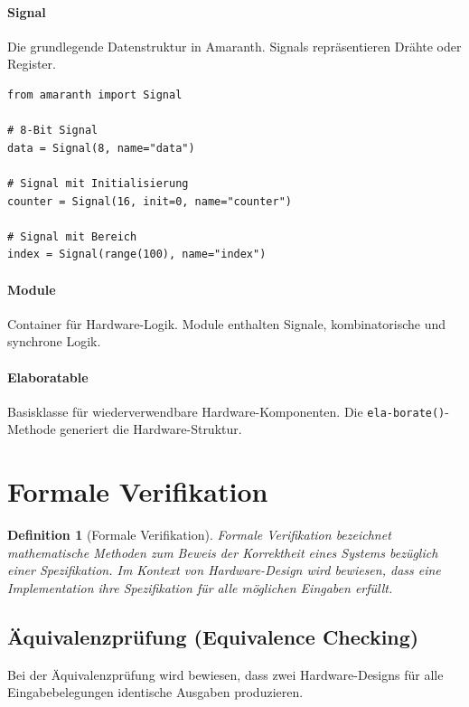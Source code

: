 ﻿\documentclass[12pt,a4paper]{report}
\newtheorem{definition}{Definition}[section]
\begin{document}
\paragraph{Signal}
Die grundlegende Datenstruktur in Amaranth. Signals repräsentieren Drähte oder Register.

\begin{lstlisting}[style=pythonstyle, caption={Amaranth Signal-Deklaration}]
from amaranth import Signal

# 8-Bit Signal
data = Signal(8, name="data")

# Signal mit Initialisierung
counter = Signal(16, init=0, name="counter")

# Signal mit Bereich
index = Signal(range(100), name="index")
\end{lstlisting}

\paragraph{Module}
Container für Hardware-Logik. Module enthalten Signale, kombinatorische und synchrone Logik.

\paragraph{Elaboratable}
Basisklasse für wiederverwendbare Hardware-Komponenten. Die \texttt{ela-\newline borate()}-Methode generiert die Hardware-Struktur.

\section{Formale Verifikation}

\begin{definition}[Formale Verifikation]
Formale Verifikation bezeichnet mathematische Methoden zum Beweis der Korrektheit eines Systems bezüglich einer Spezifikation. Im Kontext von Hardware-Design wird bewiesen, dass eine Implementation ihre Spezifikation für alle möglichen Eingaben erfüllt.
\end{definition}

\subsection{Äquivalenzprüfung (Equivalence Checking)}

Bei der Äquivalenzprüfung wird bewiesen, dass zwei Hardware-Designs für alle Eingabebelegungen identische Ausgaben produzieren.
\end{document}
